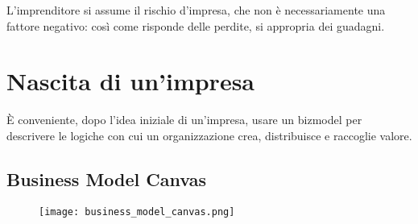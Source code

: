 L'imprenditore si assume il rischio d'impresa, che non è necessariamente una
fattore negativo: così come risponde delle perdite, si appropria dei guadagni.

\section{Nascita di un'impresa}
È conveniente, dopo l'idea iniziale di un'impresa, usare un \gls{bizmodel} per
descrivere le logiche con cui un organizzazione crea, distribuisce e raccoglie
valore.

\subsection{Business Model Canvas}

\begin{figure}[h]
    \centering
    \texttt{[image: business\_model\_canvas.png]}
\end{figure}

